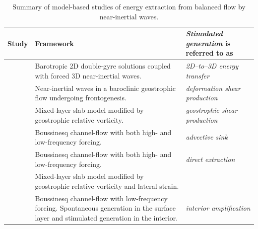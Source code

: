 \documentclass{jfm}
\begin{document}
\begin{table}
\label{modelzTable}
\caption{Summary of model-based studies of energy extraction from balanced flow by near-inertial waves.}
  \begin{center}
     \begin{tabular}{ p{} p{} |   p{}    }
       \hline
         Study &  Framework &   \textit{Stimulated generation} is referred to as \\ \hline
   \cite{gertz_straub2009} & {Barotropic 2D double-gyre solutions coupled with forced 3D
                              near-inertial waves.}
                              & \textit{2D--to--3D energy transfer}
                              \\ \hline
 \cite{thomas_2012} & {Near-inertial waves in a baroclinic geostrophic flow undergoing frontogenesis.}
                              & \textit{deformation shear production}
                              \\ \hline
    \cite{whitt_thomas2015}  & Mixed-layer slab model modified by geostrophic
                              relative vorticity.
                            & \textit{geostrophic shear production}\\ \hline
     \cite{taylor_straub2016} & Boussinesq channel-flow with both  high- and
                                  low-frequency forcing.&
                                  \textit{advective sink}\\ \hline
    \cite{barkan_etal2016} & Boussinesq channel-flow  with both high- and
                                  low-frequency forcing.
                              & \textit{direct extraction}\\ \hline
     \cite{jing_etal2017}  & Mixed-layer slab model modified by geostrophic
                              relative vorticity and lateral strain.
                          & \textit{}\\ \hline
    \cite{shakespeare_hogg2017} & Boussinesq channel-flow  with
                                  low-frequency forcing. Spontaneous generation in
                                  the surface layer and stimulated generation in
                                  the interior.
                                & \textit{interior amplification}
    \end{tabular}
  \end{center}
\end{table}
\end{document}
